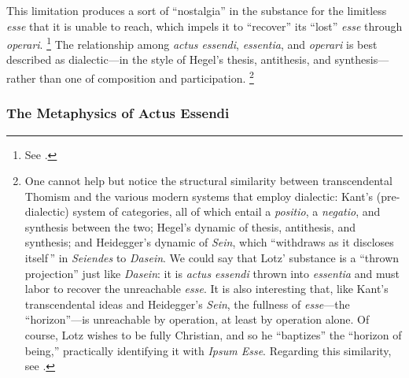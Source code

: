%
This limitation produces a sort of “nostalgia” in the substance for the limitless \emph{esse} that it is unable to reach, which impels it to “recover” its “lost” \emph{esse} through \emph{operari}.%
%
\footnote{See \cite[227-228]{contat:confronto}.}
%
The relationship among \emph{actus essendi}, \emph{essentia}, and \emph{operari} is best described as dialectic—in the style of Hegel’s thesis, antithesis, and synthesis—rather than one of composition and participation.%
%
\footnote{One cannot help but notice the structural similarity between transcendental Thomism and the various modern systems that employ dialectic: Kant’s (pre-dialectic) system of categories, all of which entail a \emph{positio}, a \emph{negatio}, and synthesis between the two; Hegel’s dynamic of thesis, antithesis, and synthesis; and Heidegger’s dynamic of \emph{Sein}, which “withdraws as it discloses itself\,” in \emph{Seiendes} to \emph{Dasein}. We could say that Lotz’ substance is a “thrown projection” just like \emph{Dasein}: it is \emph{actus essendi} thrown into \emph{essentia} and must labor to recover the unreachable \emph{esse}. It is also interesting that, like Kant’s transcendental ideas and Heidegger’s \emph{Sein}, the fullness of \emph{esse}—the “horizon”—is unreachable by operation, at least by operation alone. Of course, Lotz wishes to be fully Christian, and so he “baptizes” the “horizon of being,” practically identifying it with \emph{Ipsum Esse}.
Regarding this similarity, see \cite{contat:confronto}.}

\subsubsection{The Metaphysics of Actus Essendi}

